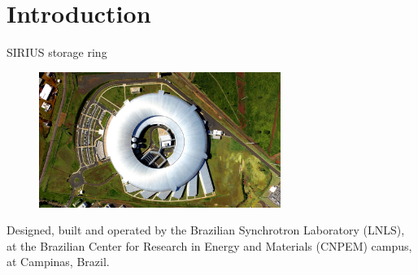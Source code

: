 \documentclass[aspectratio=169]{beamer}
\begin{document}
\section{Introduction}
\begin{frame}{SIRIUS storage ring}
    \begin{minipage}{0.35\textwidth}
        \begin{figure}
            \centering
            \includegraphics[angle=90, width=0.7\textwidth]{f1.png}
        \end{figure}
    \end{minipage}
    \hfill
    \begin{minipage}{0.62\textwidth}
        \scriptsize
        Designed, built and operated by the Brazilian Synchrotron Laboratory (LNLS), at the Brazilian Center for Research in Energy and Materials (CNPEM) campus, at Campinas, Brazil.\\


\end{minipage}
\end{frame}
\end{document}
